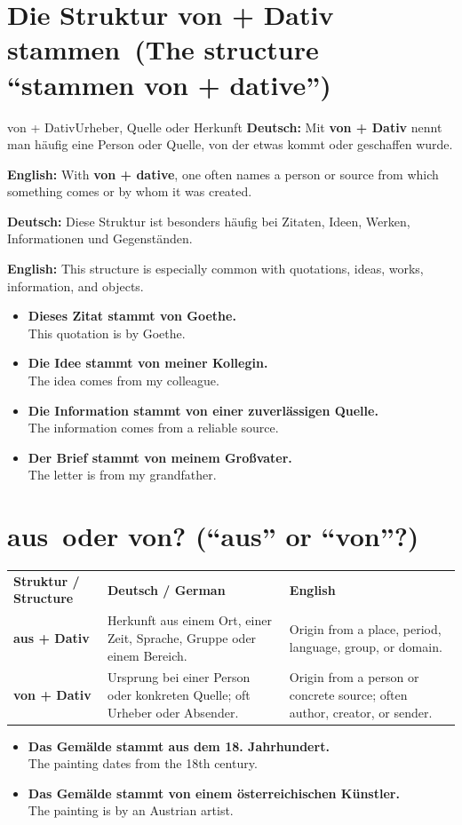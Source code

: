 \documentclass[a4paper,11pt]{article}
\newcommand{\GermanText}[1]{\textbf{Deutsch: }#1\par}
\newcommand{\EnglishText}[1]{{\small\color{SoftGray}\textbf{English: }#1\par}}
\newcommand{\ExampleItem}[2]{\item \textbf{#1}\\{\small\color{SoftGray}#2}}
\begin{document}
\section{Die Struktur \glqq von + Dativ stammen\grqq\ \textnormal{(The structure ``stammen von + dative'')}}
\begin{grammarentry}{von + Dativ}{Urheber, Quelle oder Herkunft}
\GermanText{Mit \textbf{von + Dativ} nennt man häufig eine Person oder Quelle, von der etwas kommt oder geschaffen wurde.}
\EnglishText{With \textbf{von + dative}, one often names a person or source from which something comes or by whom it was created.}
\GermanText{Diese Struktur ist besonders häufig bei Zitaten, Ideen, Werken, Informationen und Gegenständen.}
\EnglishText{This structure is especially common with quotations, ideas, works, information, and objects.}
\end{grammarentry}
\begin{exbox}
\begin{itemize}
\ExampleItem{Dieses Zitat stammt von Goethe.}{This quotation is by Goethe.}
\ExampleItem{Die Idee stammt von meiner Kollegin.}{The idea comes from my colleague.}
\ExampleItem{Die Information stammt von einer zuverlässigen Quelle.}{The information comes from a reliable source.}
\ExampleItem{Der Brief stammt von meinem Großvater.}{The letter is from my grandfather.}
\end{itemize}
\end{exbox}

\section{\glqq aus\grqq\ oder \glqq von\grqq? \textnormal{(``aus'' or ``von''?)}}
\begin{longtable}{>{\bfseries}p{3.0cm}|p{5.2cm}|p{6.0cm}}
\rowcolor{HeaderBlueDark}
\color{white}\textbf{Struktur / Structure} & \color{white}\textbf{Deutsch / German} & \color{white}\textbf{English} \\
\textbf{aus + Dativ} & Herkunft aus einem Ort, einer Zeit, Sprache, Gruppe oder einem Bereich. & Origin from a place, period, language, group, or domain. \\
\textbf{von + Dativ} & Ursprung bei einer Person oder konkreten Quelle; oft Urheber oder Absender. & Origin from a person or concrete source; often author, creator, or sender. \\
\end{longtable}
\begin{exbox}
\begin{itemize}
\ExampleItem{Das Gemälde stammt aus dem 18. Jahrhundert.}{The painting dates from the 18th century.}
\ExampleItem{Das Gemälde stammt von einem österreichischen Künstler.}{The painting is by an Austrian artist.}
\end{itemize}
\end{exbox}
\end{document}
